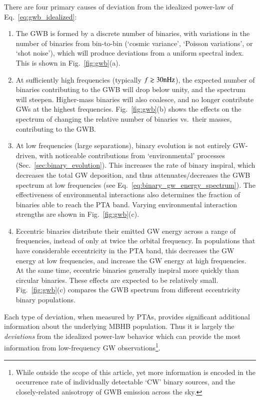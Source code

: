 \documentclass[onecolumn,authoryear]{els-mrw}
\begin{document}
There are four primary causes of deviation from the idealized power-law of Eq.~\ref{eq:gwb_idealized}:
\begin{enumerate}
    \item The GWB is formed by a discrete number of binaries, with variations in the number of binaries from bin-to-bin (`cosmic variance', `Poisson variations', or `shot noise'), which will produce deviations from a uniform spectral index.  This is shown in Fig.~\ref{fig:gwb}(a).
    \item At sufficiently high frequencies (typically $f \gtrsim 30 \textrm{nHz}$), the expected number of binaries contributing to the GWB will drop below unity, and the spectrum will steepen.  Higher-mass binaries will also coalesce, and no longer contribute GWs at the highest frequencies.  Fig.~\ref{fig:gwb}(b) shows the effects on the spectrum of changing the relative number of binaries vs.~their masses, contributing to the GWB.
    \item At low frequencies (large separations), binary evolution is not entirely GW-driven, with noticeable contributions from `environmental' processes (Sec.~\ref{sec:binary_evolution}).  This increases the rate of binary inspiral, which decreases the total GW deposition, and thus attenuates/decreases the GWB spectrum at low frequencies (see Eq.~\ref{eq:binary_gw_energy_spectrum}).  The effectiveness of environmental interactions also determines the fraction of binaries able to reach the PTA band.  Varying environmental interaction strengths are shown in Fig.~\ref{fig:gwb}(c).
    \item Eccentric binaries distribute their emitted GW energy across a range of frequencies, instead of only at twice the orbital frequency.  In populations that have considerable eccentricity in the PTA band, this decreases the GW energy at low frequencies, and increase the GW energy at high frequencies.  At the same time, eccentric binaries generally inspiral more quickly than circular binaries.  These effects are expected to be relatively small.  Fig.~\ref{fig:gwb}(c) compares the GWB spectrum from different eccentricity binary populations.
\end{enumerate}
Each type of deviation, when measured by PTAs, provides significant additional information about the underlying MBHB population.  Thus it is largely the \textit{deviations} from the idealized power-law behavior which can provide the most information from low-frequency GW observations\footnote{While outside the scope of this article, yet more information is encoded in the occurrence rate of individually detectable `CW' binary sources, and the closely-related anisotropy of GWB emission across the sky.}.
\end{document}

